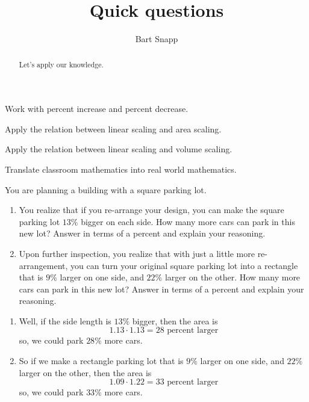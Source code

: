 \documentclass[nooutcomes,noauthor,handout,12pt]{ximera}
\title{Quick questions}
\author{Bart Snapp}
\begin{document}
\begin{abstract}
  Let's apply our knowledge.
\end{abstract}
\maketitle


\begin{listOutcomes}
\item Work with percent increase and percent decrease.
\item Apply the relation between linear scaling and area scaling.
\item Apply the relation between linear scaling and volume scaling.
\item Translate classroom mathematics into real world mathematics. 
\end{listOutcomes}

\mynewpage


\begin{question}
  You are planning a building with a square parking lot.
  \begin{enumerate}
  \item You realize that if you re-arrange your design, you can make
    the square parking lot $13\%$ bigger on each side. How many more
    cars can park in this new lot? Answer in terms of a percent and
    explain your reasoning.
  \item Upon further inspection, you realize that with just a little
    more re-arrangement, you can turn your original square parking lot
    into a rectangle that is $9\%$ larger on one side, and $22\%$
    larger on the other. How many more cars can park in this new lot?
    Answer in terms of a percent and explain your reasoning.
  \end{enumerate}
  \begin{freeResponse}
    \begin{enumerate}
    \item Well, if the side length is $13\%$ bigger, then the area is
      \[
      1.13\cdot 1.13 = \text{$28$ percent larger}
      \]
      so, we could park $28\%$ more cars.
    \item So if we make a rectangle parking lot that is $9\%$ larger on
      one side, and $22\%$ larger on the other, then the area is
      \[
      1.09\cdot 1.22 = \text{$33$ percent larger}
      \]
      so, we could park $33\%$ more cars.
    \end{enumerate}
  \end{freeResponse}
\end{question}
\mynewpage
\end{document}
